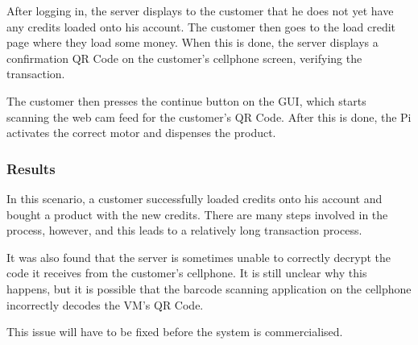 After logging in, the server displays to the customer that he does not yet have any
credits loaded onto his account. The customer then goes to the load credit page where
they load some money. When this is done, the server displays a confirmation QR Code on
the customer's cellphone screen, verifying the transaction.

The customer then presses the continue button on the GUI, which starts scanning the web
cam feed for the customer's QR Code. After this is done, the Pi activates the correct
motor and dispenses the product.

\subsubsection{Results}

In this scenario, a customer successfully loaded credits onto his account and bought a
product with the new credits. There are many steps involved in the process, however, and
this leads to a relatively long transaction process. 

It was also found that the server is sometimes unable to correctly decrypt the code it
receives from the customer's cellphone. It is still unclear why this happens, but it is
possible that the barcode scanning application on the cellphone incorrectly decodes the
VM's QR Code. 

This issue will have to be fixed before the system is commercialised.

